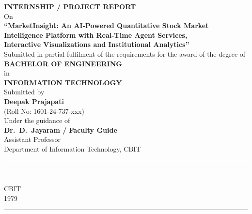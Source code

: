 \documentclass[12pt,a4paper]{report}
\begin{document}
\begin{titlepage}
\centering
\vspace*{0.5cm}

{\large\bfseries INTERNSHIP / PROJECT REPORT}\\[0.3cm]
{\normalsize On}\\[0.6cm]

{\LARGE\bfseries\color{cbitred}
  ``MarketInsight: An AI-Powered Quantitative Stock Market\\[4pt]
  Intelligence Platform with Real-Time Agent Services,\\[4pt]
  Interactive Visualizations and Institutional Analytics''}\\[1.0cm]

{\normalsize Submitted in partial fulfilment of the requirements for the award of the degree of}\\[0.3cm]
{\large\bfseries BACHELOR OF ENGINEERING}\\[0.2cm]
{\normalsize in}\\[0.2cm]
{\large\bfseries INFORMATION TECHNOLOGY}\\[0.8cm]

{\normalsize Submitted by}\\[0.2cm]
{\large\bfseries Deepak Prajapati}\\[0.1cm]
{\normalsize (Roll No: 1601-24-737-xxx)}\\[0.8cm]

{\normalsize Under the guidance of}\\[0.3cm]
{\large\bfseries Dr.\ D.\ Jayaram / Faculty Guide}\\[0.1cm]
{\normalsize Assistant Professor}\\
{\normalsize Department of Information Technology, CBIT}\\[0.8cm]

\textcolor{cbitred}{\rule{0.6\textwidth}{1.5pt}}\\[0.8cm]

\begin{tcolorbox}[
  width=3.2cm, height=3.2cm,
  colback=white, colframe=cbitred,
  halign=center, valign=center,
  fontupper=\small\bfseries\color{cbitred}
]
CBIT\\1979
\end{tcolorbox}

\vspace{0.6cm}
\textcolor{cbitred}{\rule{0.6\textwidth}{1.5pt}}\\[0.8cm]


\end{titlepage}
\end{document}
